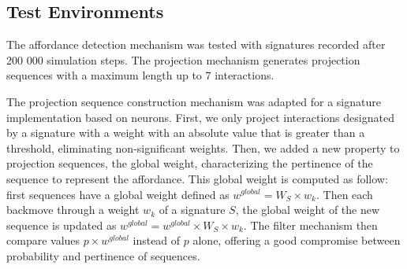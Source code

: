 \documentclass[conference]{IEEEtran}
\begin{document}


\subsection{Test Environments}\label{test}

The affordance detection mechanism was tested with signatures recorded after 200 000 simulation steps. %
The projection mechanism generates projection sequences with a maximum length up to 7 interactions.

The projection sequence construction mechanism was adapted for a signature implementation based on neurons. First, we only project interactions designated by a signature with a weight with an absolute value that is greater than a threshold, eliminating non-significant weights. Then, %
we added a new property to projection sequences, the global weight, characterizing the pertinence of the sequence to represent the affordance. This global weight is computed as follow: first sequences have a global weight defined as $w^{global} = W_S \times w_k$. Then each backmove through a weight $w_k$ of a signature $S$, the global weight of the new sequence is updated as $w^{global}=w^{global} \times  W_S \times w_k$. The filter mechanism then compare values $p \times w^{global}$ instead of $p$ alone, offering a good compromise between probability and pertinence of sequences.




\end{document}
